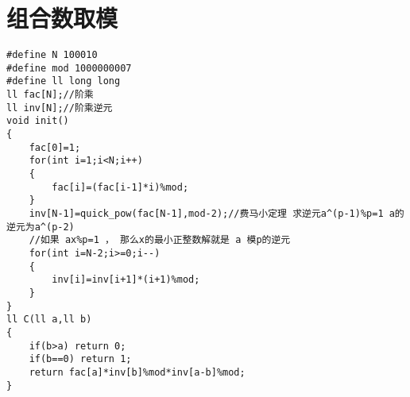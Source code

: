 \section{组合数取模}
\begin{lstlisting}
#define N 100010
#define mod 1000000007
#define ll long long
ll fac[N];//阶乘
ll inv[N];//阶乘逆元
void init()
{
    fac[0]=1;
    for(int i=1;i<N;i++)
    {
        fac[i]=(fac[i-1]*i)%mod;
    }
    inv[N-1]=quick_pow(fac[N-1],mod-2);//费马小定理 求逆元a^(p-1)%p=1 a的逆元为a^(p-2)
    //如果 ax%p=1 ， 那么x的最小正整数解就是 a 模p的逆元
    for(int i=N-2;i>=0;i--)
    {
        inv[i]=inv[i+1]*(i+1)%mod;
    }
}
ll C(ll a,ll b)
{
    if(b>a) return 0;
    if(b==0) return 1;
    return fac[a]*inv[b]%mod*inv[a-b]%mod;
}
\end{lstlisting}